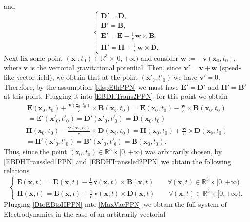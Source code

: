 \documentclass{article}
\theoremstyle{definition}
\theoremstyle{remark}
\renewcommand{\vec}[1]{\mathbf{#1}}
\newcommand{\R}{\mathbb{R}}
\newcommand{\er}{\eqref}
\newcommand{\R}{{\mathbb{R}}}
\newcommand{\er}{\eqref}
\begin{document}
%
%
%
and
\begin{equation}\label{EBDHTrans2PPN}
\begin{cases}
\vec D'=\vec D,\\
\vec B'=\vec B,\\
\vec E'=\vec E-\frac{1}{c}\,\vec w\times \vec B,\\
\vec H'=\vec H+\frac{1}{c}\,\vec w\times \vec D.
\end{cases}
\end{equation}
Next fix some point $(\vec x_0,t_0)\in\R^3\times[0,+\infty)$ and
consider $\vec w:=-\vec v(\vec x_0,t_0)$, where $\vec v$ is the
vectorial gravitational potential. Then, since $\vec v'=\vec v+\vec
w$ (speed-like vector field), we obtain that at the point $(\vec
x'_0,t'_0)$ we have $\vec v'=0$. Therefore, by the assumption
\er{IdspEthPPN} we must have $\vec E'=\vec D'$ and $\vec H'=\vec B'$
at this point. Plugging it into \er{EBDHTrans2PPN}, for this point
we obtain
\begin{multline}
\label{EBDHTranssled1PPN} \vec E(\vec x_0,t_0)+\frac{\vec v(\vec
x_0,t_0)}{c}\times \vec B(\vec x_0,t_0)=\vec E(\vec
x_0,t_0)-\frac{\vec w}{c}\times \vec B(\vec x_0,t_0)\\=\vec E'(\vec
x'_0,t'_0)=\vec D'(\vec x'_0,t'_0)=\vec D(\vec x_0,t_0)
\end{multline}
\begin{multline} \label{EBDHTranssled2PPN}
\vec H(\vec x_0,t_0)-\frac{\vec v(\vec x_0,t_0)}{c}\times \vec
D(\vec x_0,t_0)=\vec H(\vec x_0,t_0)+\frac{\vec w}{c}\times \vec
D(\vec x_0,t_0)\\=\vec H'(\vec x'_0,t'_0)=\vec B'(\vec
x'_0,t'_0)=\vec B(\vec x_0,t_0).
\end{multline}
Thus, since the point $(\vec x_0,t_0)\in\R^3\times[0,+\infty)$ was
arbitrarily chosen, by \er{EBDHTranssled1PPN} and
\er{EBDHTranssled2PPN} we obtain the following relations
\begin{equation}\label{DtoEBtoHPPN}
\begin{cases}
\vec E(\vec x,t)=\vec D(\vec x,t)-\frac{1}{c}\,\vec v(\vec
x,t)\times
\vec B(\vec x,t)\quad\quad\forall(\vec x,t)\in\R^3\times[0,+\infty)\\
\vec H(\vec x,t)=\vec B(\vec x,t)+\frac{1}{c}\,\vec v(\vec
x,t)\times \vec D(\vec x,t)\quad\quad\forall(\vec
x,t)\in\R^3\times[0,+\infty).
\end{cases}
\end{equation}
Plugging \er{DtoEBtoHPPN} into \er{MaxVacPPN} we obtain the full
system of Electrodynamics in the case of an arbitrarily vectorial
\end{document}
